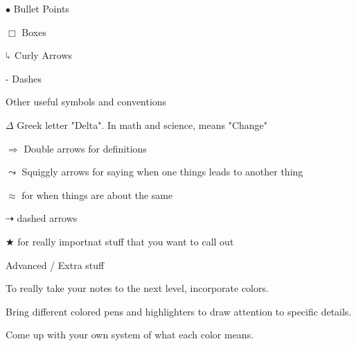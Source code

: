 \documentclass[../main.tex]{subfiles}
\begin{document}
\begin{outline}[enumerate]
\begin{displayquote}
	\quad \(\bullet\) Bullet Points

	\quad \quad $\Box$ Boxes

	\quad $\rotatebox[origin=c]{180}{$\Lsh$}$ Curly Arrows

	\quad \quad - Dashes
	\end{displayquote}


	\1 Other useful symbols and conventions

	$\Delta$ Greek letter "Delta".  In math and science, means "Change"

	$\Rightarrow$ Double arrows for definitions

	$\leadsto$ Squiggly arrows for saying when one things leads to another thing

	$\approx$ for when things are about the same

	$\dashrightarrow$ dashed arrows

	$\bigstar$ for really importnat stuff that you want to call out




	\1 Advanced / Extra stuff

	\color{dracPurple}To really take your notes to the next level, incorporate colors.\color{black}

	\colorbox{dracCyan}{\color{dracRed}Bring different colored pens and highlighters to draw attention to specific details.}\color{black}

	\color{dracOrange}Come up with your own system of what each color means.\color{black}

\end{outline}
\end{document}

